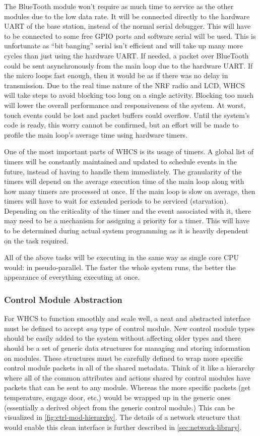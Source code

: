 The BlueTooth module won't require as much time to service as the other modules
due to the low data rate. It will be connected directly to the hardware UART of
the base station, instead of the normal serial debugger. This will have to be
connected to some free GPIO ports and software serial will be used. This is
unfortunate as ``bit banging'' serial isn't efficient and will take up many
more cycles than just using the hardware UART. If needed, a packet over
BlueTooth could be sent asynchronously from the main loop due to the hardware
UART. If the micro loops fast enough, then it would be as if there was no delay
in transmission. Due to the real time nature of the NRF radio and LCD, WHCS
will take steps to avoid blocking too long on a single activity. Blocking too
much will lower the overall performance and responsiveness of the system. At
worst, touch events could be lost and packet buffers could overflow. Until the
system's code is ready, this worry cannot be confirmed, but an effort will be
made to profile the main loop's average time using hardware timers.

One of the most important parts of WHCS is its usage of timers. A global list
of timers will be constantly maintained and updated to schedule events
in the future, instead of having to handle them immediately. The granularity of
the timers will depend on the average execution time of the main loop along
with how many timers are processed at once. If the main loop is slow on
average, then timers will have to wait for extended periods to be serviced
(starvation). Depending on the criticality of the timer and the event
associated with it, there may need to be a mechanism for assigning a priority
for a timer. This will have to be determined during actual system programming
as it is heavily dependent on the task required.

All of the above tasks will be executing in the same way as single core CPU
would: in pseudo-parallel. The faster the whole system runs, the better the
appearance of everything executing at once.

\subsubsection{Control Module Abstraction}
For WHCS to function smoothly and scale well, a neat and abstracted interface
must be defined to accept \emph{any} type of control module. New control module
types should be easily added to the system without affecting older types and
there should be a set of generic data structures for managing and storing
information on modules. These structures must be carefully defined to wrap more
specific control module packets in all of the shared metadata. Think of it like
a hierarchy where all of the common attributes and actions shared by control
modules have packets that can be sent to any module. Whereas the more specific
packets (get temperature, engage door, etc.) would be wrapped up in the generic
ones (essentially a derived object from the generic control module.) This can
be visualized in \autoref{fig:ctrl-mod-hierarchy}. The
details of a network structure that would enable this clean interface is
further described in \autoref{sec:network-library}.

